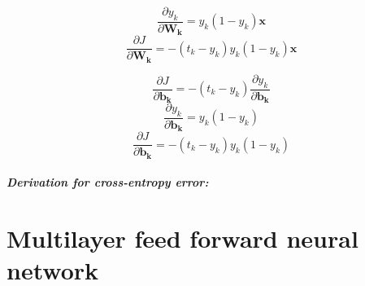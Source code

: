 \documentclass{article}
\begin{document}
$$\dfrac{\partial{y_k}}{\partial{\mathbf{W_k}}} = y_k(1 - y_k)\mathbf{x}$$
$$\dfrac{\partial{J}}{\partial{\mathbf{W_k}}} = -(t_k - y_k)y_k(1 - y_k)\mathbf{x}$$


$$\dfrac{\partial{J}}{\partial{\mathbf{b_k}}} = -(t_k - y_k) \dfrac{\partial{y_k}}{\partial{\mathbf{b_k}}}$$
$$\dfrac{\partial{y_k}}{\partial{\mathbf{b_k}}} = y_k(1 - y_k)$$
$$\dfrac{\partial{J}}{\partial{\mathbf{b_k}}} = -(t_k - y_k)y_k(1 - y_k)$$

\subparagraph{Derivation for cross-entropy error:}


\section*{Multilayer feed forward neural network}
\end{document}
